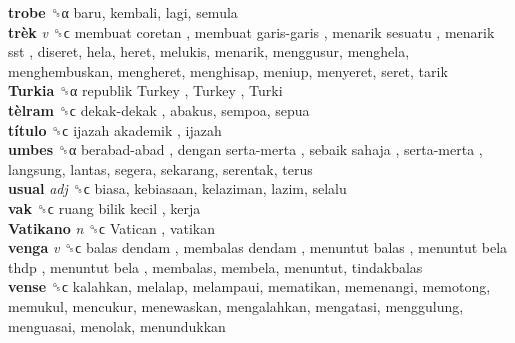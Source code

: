 \textbf{trobe} ␝α  baru, kembali, lagi, semula  \\
\textbf{trèk} \emph{v}  ␝ϲ   membuat coretan ,  membuat garis-garis ,  menarik sesuatu ,  menarik sst , diseret, hela, heret, melukis, menarik, menggusur, menghela, menghembuskan, mengheret, menghisap, meniup, menyeret, seret, tarik  \\
\textbf{Turkia} ␝α   republik Turkey ,  Turkey ,  Turki   \\
\textbf{tèlram} ␝ϲ   dekak-dekak , abakus, sempoa, sepua  \\
\textbf{título} ␝ϲ   ijazah akademik , ijazah  \\
\textbf{umbes} ␝α   berabad-abad ,  dengan serta-merta ,  sebaik sahaja ,  serta-merta , langsung, lantas, segera, sekarang, serentak, terus  \\
\textbf{usual} \emph{adj}  ␝ϲ  biasa, kebiasaan, kelaziman, lazim, selalu  \\
\textbf{vak} ␝ϲ   ruang bilik kecil , kerja  \\
\textbf{Vatikano} \emph{n}  ␝ϲ   Vatican , vatikan  \\
\textbf{venga} \emph{v}  ␝ϲ   balas dendam ,  membalas dendam ,  menuntut balas ,  menuntut bela thdp ,  menuntut bela , membalas, membela, menuntut, tindakbalas  \\
\textbf{vense} ␝ϲ  kalahkan, melalap, melampaui, mematikan, memenangi, memotong, memukul, mencukur, menewaskan, mengalahkan, mengatasi, menggulung, menguasai, menolak, menundukkan  \\
